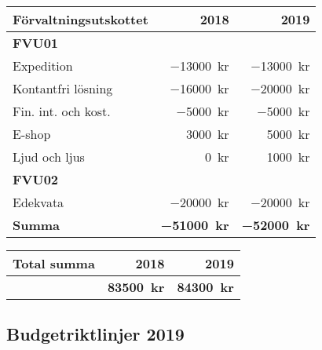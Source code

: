 \documentclass[../_main/handlingar.tex]{subfiles}
\begin{document}
\begin{tabularx}{10cm}{X r r}
    \textbf{\large Förvaltningsutskottet} & \textbf{2018} & \textbf{2019} \\
    \hline
    \textbf{FVU01} \\
    Expedition & \SI{-13000}{kr} & \SI{-13000}{kr} \\
    Kontantfri lösning & \SI{-16000}{kr} & \SI{-20000}{kr} \\
    Fin. int. och kost. & \SI{-5000}{kr} & \SI{-5000}{kr} \\
    E-shop & \SI{3000}{kr} & \SI{5000}{kr} \\
    Ljud och ljus & \SI{0}{kr} & \SI{1000}{kr}\\
    \textbf{FVU02} \\
    Edekvata & \SI{-20000}{kr} & \SI{-20000}{kr} \\
    \hline
    \textbf{Summa} & \textbf{\SI{-51000}{kr}} & \textbf{\SI{-52000}{kr}} \\
\end{tabularx}

\begin{tabularx}{10cm}{X r r}
    \textbf{\large Total summa} & \textbf{2018} & \textbf{2019} \\
    \hline
     & \textbf{\SI{83500}{kr}} & \textbf{\SI{84300}{kr}} \\
\end{tabularx}


\newpage
\subsection*{Budgetriktlinjer 2019}
\end{document}
